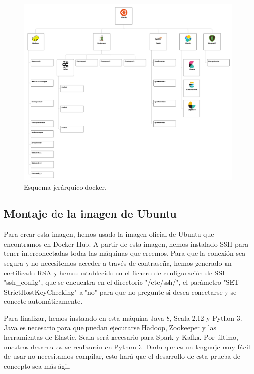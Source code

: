 \begin{figure}[htp]
\centering
\includegraphics[scale=0.20]{Imagenes/arqProp2.png}
\caption{Esquema jerárquico docker.}
\label{lmdarq2}
\end{figure}

\subsection{Montaje de la imagen de Ubuntu\label{montUbuntu}}

Para crear esta imagen, hemos usado la imagen oficial de Ubuntu que encontramos en Docker Hub. A partir de esta imagen, hemos instalado SSH para tener interconectadas todas las máquinas que creemos. Para que la conexión sea segura y no necesitemos acceder a través de contraseña, hemos generado un certificado RSA y hemos establecido en el fichero de configuración de SSH "ssh\_config", que se encuentra en el directorio "/etc/ssh/", el parámetro  "SET StrictHostKeyChecking" a  "no" para que no pregunte si desea conectarse y se conecte automáticamente.

Para finalizar, hemos instalado en esta máquina Java 8, Scala 2.12 y Python 3. Java es necesario para que puedan ejecutarse Hadoop, Zookeeper y las herramientas de Elastic. Scala será necesario para Spark y Kafka. Por último, nuestros desarrollos se realizarán en Python 3. Dado que es un lenguaje muy fácil de usar no necesitamos compilar, esto hará que el desarrollo de esta prueba de concepto sea más ágil.

